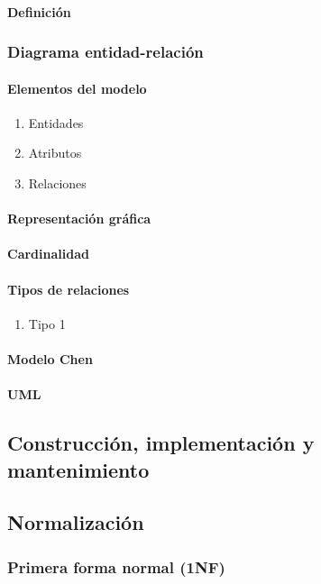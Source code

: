 \documentclass[12pt]{report}
\begin{document}
				\paragraph{Definición}
			\subsubsection{Diagrama entidad-relación}
				\paragraph{Elementos del modelo}
					\begin{enumerate}
						\item Entidades
						\item Atributos
						\item Relaciones
					\end{enumerate}
				\paragraph{Representación gráfica}
				\paragraph{Cardinalidad}
				\paragraph{Tipos de relaciones}
					\begin{enumerate}
						\item Tipo 1
					\end{enumerate}
				\paragraph{Modelo Chen}
				\paragraph{UML}
		\subsection{Construcción, implementación y mantenimiento}
		\subsection{Normalización}
			\subsubsection{Primera forma normal (1NF)}
\end{document}
